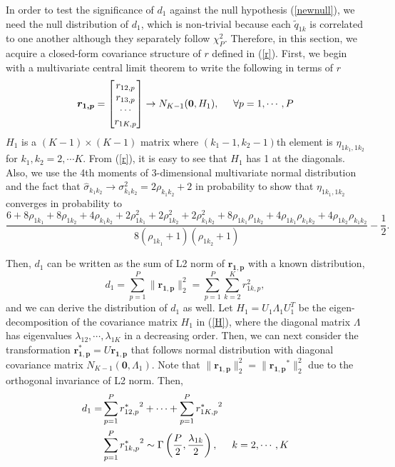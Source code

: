 \documentclass[12pt]{extarticle}
\theoremstyle{theorem}
\begin{document}
\vspace{5mm} \noindent
In order to test the significance of $d_1$ against the null hypothesis (\ref{newnull}), we need the null distribution of $d_1$, which is non-trivial because each $\tilde{q}_{1k}$ is correlated to one another although they separately follow $\chi_{P}^2$. Therefore, in this section, we acquire a closed-form covariance structure of $r$ defined in (\ref{r}). First, we begin with a multivariate central limit theorem to write the following in terms of $r$
\begin{equation}
\bm{r_{1,p}} = \begin{bmatrix}
r_{12,p} \\ r_{13, p} \\ \cdots \\ r_{1K,p}
\end{bmatrix}  \rightarrow N_{K-1}(\bm{0}, H_1), \hspace{5mm} \forall p = 1, \cdots, P
\label{H}
\end{equation}
$H_1$ is a $(K-1) \times (K-1)$ matrix where $(k_1-1, k_2-1)$th element is $\eta_{1k_1, 1k_2}$ for $k_1, k_2 = 2, \cdots K$. From (\ref{r}), it is easy to see that $H_1$ has 1 at the diagonals. Also, we use the 4th moments of 3-dimensional multivariate normal distribution and the fact that $\hat{\sigma}_{k_1k_2} \rightarrow \sigma_{k_1k_2}^2 = 2\rho_{k_1k_2} + 2$ in probability to show that $\eta_{1k_1, 1k_2}$ converges in probability to
\begin{equation} \frac{6+8\rho_{1k_1}+8\rho_{1k_2}+4\rho_{k_1k_2}+2\rho^2_{1k_1}+2\rho^2_{1k_2}+2\rho^2_{k_1k_2}+8\rho_{1k_1}\rho_{1k_2}+4\rho_{1k_1}\rho_{k_1k_2}+4\rho_{1k_2}\rho_{k_1k_2}}{8(\rho_{1k_1}+1)(\rho_{1k_2}+1)} - \frac{1}{2} .
\label{eta}
\end{equation}

\noindent Then, $d_1$ can be written as the sum of L2 norm of $\bm{r_{1,p}}$ with a known distribution, 
\begin{equation}
d_1 = \sum_{p=1}^{P} \|\bm{r_{1,p}}\|_2^2 = \sum_{p=1}^{P} \sum_{k=2}^K r_{1k,p}^2,
\label{d2}
\end{equation}
and we can derive the distribution of $d_1$ as well. Let $H_1 = U_1 \Lambda_1 U_1^T$ be the eigen-decomposition of the covariance matrix $H_1$ in (\ref{H}), where the diagonal matrix $\Lambda$ has eigenvalues $\lambda_{12}, \cdots, \lambda_{1K}$ in a decreasing order. Then, we can next consider the transformation $\bm{r_{1,p}^*} = U\bm{r_{1,p}}$ that follows normal distribution with diagonal covariance matrix $N_{K-1}(\bm{0}, \Lambda_1)$. Note that $\|\bm{r_{1,p}}\|_2^2 = \|\bm{r_{1,p}}^*\|_2^2$ due to the orthogonal invariance of L2 norm. Then,
\begin{align}
d_1 = & \sum_{p=1}^{P} {r_{12,p}^*}^2 + \cdots +\sum_{p=1}^P{r_{1K,p}^*}^2\\
&\sum_{p=1}^{P} {r_{1k,p}^*}^2 \sim \Gamma \left( \frac{P}{2}, \frac{\lambda_{1k}}{2} \right), \hspace{5mm} k = 2, \cdots, K
\label{d_dist}
\end{align}
\end{document}
